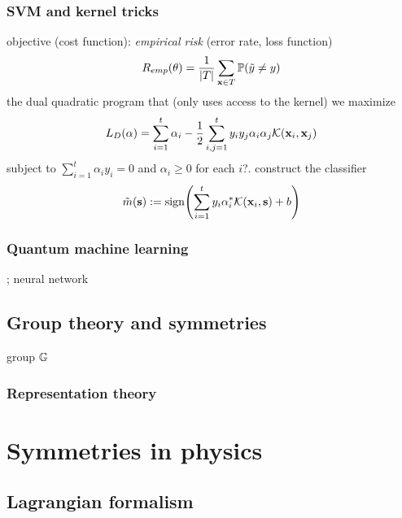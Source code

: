 \subsubsection{SVM and kernel tricks}
objective (cost function): \emph{empirical risk} (error rate, loss function)
\begin{equation}
	R_{emp}(\vb{\theta}) = \frac{1}{\abs{T}}
	\sum_{\vb{x}\in T} \mathbb{P} (\tilde{y} \neq y)
\end{equation}
the dual quadratic program that (only uses access to the kernel)
we maximize 
\begin{equation}
	L_D(\alpha) = \sum_{i=1}^t \alpha_i - \frac{1}{2}\sum_{i,j=1}^t y_i y_j \alpha_i \alpha_j \mathcal{K}(\vb{x}_i,\vb{x}_j)
\end{equation}
subject to $\sum_{i=1}^t \alpha_i y_i = 0$ and $\alpha_i\ge 0$ for each $i$?.
construct the classifier
\begin{equation}
	\tilde{m}(\vb{s}) := \textup{sign} \qty(
		\sum_{i=1}^t y_i \alpha_i^* \mathcal{K}(\vb{x}_i,\vb{s}) + b
	)
\end{equation}

\subsubsection{Quantum machine learning}\label{sec:quantum_machine_learning}
\cite{biamonteQuantumMachineLearning2017}; neural network

\subsection{Group theory and symmetries}
group $\mathbb{G}$

\subsubsection{Representation theory}\label{sec:representation_theory}

\section{Symmetries in physics}
\subsection{Lagrangian formalism}\label{sec:lagrangian}

